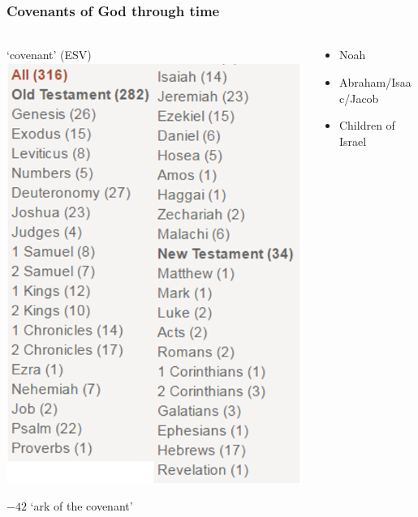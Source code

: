 \begin{frame}
\frametitle{Covenants of God through time}
\framesubtitle{}
\begin{columns}[c]
\begin{column}{0.4\textwidth}
	\begin{center}
		`covenant' (ESV)\\
		\includegraphics[width=\columnwidth]{figures/covenant.png}
	\end{center}
	{\footnotesize $-42$ `ark of the covenant'}
\end{column}
\begin{column}{0.6\textwidth}
	\begin{itemize}
		\item{Noah}
		\item{Abraham/Isaac/Jacob}
		\item{Children of Israel}
	\end{itemize}

\end{column}
\end{columns}
\end{frame}
